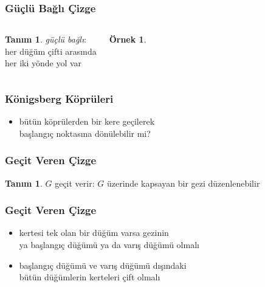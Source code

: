 \documentclass[dvipsnames]{beamer}
\theoremstyle{definition}
\newtheorem{tanim}[theorem]{Tanım}
\theoremstyle{example}
\newtheorem{ornek}[theorem]{Örnek}
\theoremstyle{plain}
\begin{document}
\begin{frame}
  \frametitle{Güçlü Bağlı Çizge}

  \begin{columns}
    \begin{tanim}
      \emph{güçlü bağlı}:\\
      her düğüm çifti arasında\\
      her iki yönde yol var
    \end{tanim}

    \begin{ornek}
      \begin{center}
      \end{center}
    \end{ornek}
  \end{columns}
\end{frame}

\begin{frame}
  \frametitle{Königsberg Köprüleri}

  \begin{center}
  \end{center}

  \begin{itemize}
    \item bütün köprülerden bir kere geçilerek\\
      başlangıç noktasına dönülebilir mi?
  \end{itemize}
\end{frame}

\begin{frame}
  \frametitle{Geçit Veren Çizge}

  \begin{tanim}
    $G$ \alert{geçit verir}: $G$ üzerinde kapsayan bir gezi düzenlenebilir
  \end{tanim}

  \begin{center}
  \end{center}
\end{frame}

\begin{frame}
  \frametitle{Geçit Veren Çizge}

  \begin{itemize}
    \item kertesi tek olan bir düğüm varsa gezinin\\
      ya başlangıç düğümü ya da varış düğümü olmalı
    \item başlangıç düğümü ve varış düğümü dışındaki\\
      bütün düğümlerin kerteleri çift olmalı
  \end{itemize}
\end{frame}
\end{document}
